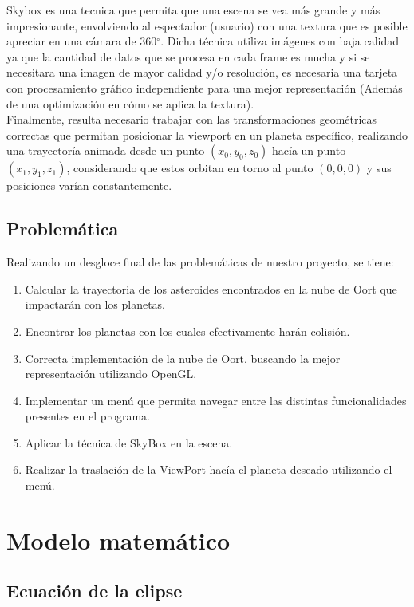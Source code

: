 \documentclass[journal]{IEEEtran}
\begin{document}
Skybox es una tecnica que permita que una escena se vea más grande y más impresionante, envolviendo al espectador (usuario) con una textura que es posible apreciar en una cámara de 360$^{\circ}$\cite{skybox}. Dicha técnica utiliza imágenes con baja calidad ya que la cantidad de datos que se procesa en cada frame es mucha y si se necesitara una imagen de mayor calidad y/o resolución, es necesaria una tarjeta con procesamiento gráfico independiente para una mejor representación (Además de una optimización en cómo se aplica la textura).\\

Finalmente, resulta necesario trabajar con las transformaciones geométricas correctas que permitan posicionar la viewport en un planeta específico, realizando una trayectoría animada desde un punto $(x_{0}, y_{0}, z_{0})$ hacía un punto $(x_{1}, y_{1}, z_{1})$, considerando que estos orbitan en torno al punto $(0,0,0)$ y sus posiciones varían constantemente.

\subsection{Problemática}
Realizando un desgloce final de las problemáticas de nuestro proyecto, se tiene:\\

\begin{enumerate}
	\item Calcular la trayectoria de los asteroides encontrados en la nube de Oort que impactarán con los planetas.
	\item Encontrar los planetas con los cuales efectivamente harán colisión.
	\item Correcta implementación de la nube de Oort, buscando la mejor representación utilizando OpenGL.
	\item Implementar un menú que permita navegar entre las distintas funcionalidades presentes en el programa.
	\item Aplicar la técnica de SkyBox en la escena.
	\item Realizar la traslación de la ViewPort hacía el planeta deseado utilizando el menú.
\end{enumerate}

\section{Modelo matemático}

\subsection{Ecuación de la elipse}
\end{document}

